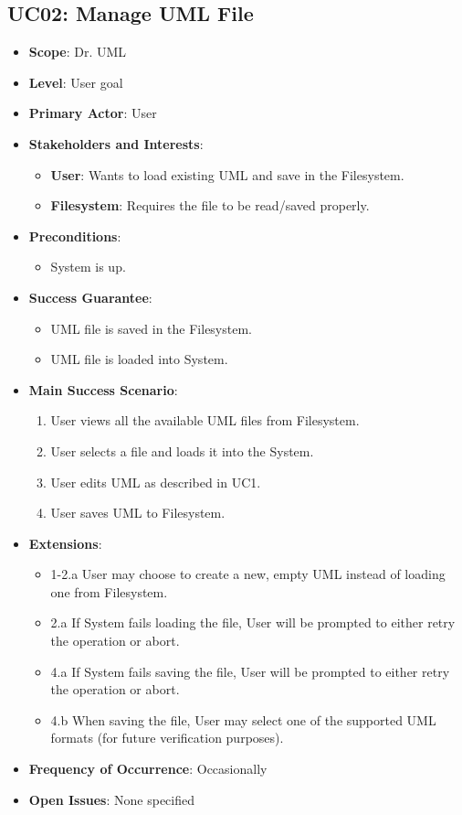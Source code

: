 \documentclass[12pt]{article}
\begin{document}
\subsection{UC02: Manage UML File}
\begin{itemize}
    \item \textbf{Scope}: Dr. UML
    \item \textbf{Level}: User goal
    \item \textbf{Primary Actor}: User
    \item \textbf{Stakeholders and Interests}:
    \begin{itemize}
        \item \textbf{User}: Wants to load existing UML and save in the Filesystem.
        \item \textbf{Filesystem}: Requires the file to be read/saved properly.
    \end{itemize}
    \item \textbf{Preconditions}:
    \begin{itemize}
        \item System is up.
    \end{itemize}
    \item \textbf{Success Guarantee}: 
    \begin{itemize}
        \item UML file is saved in the Filesystem.
        \item UML file is loaded into System.
    \end{itemize}
    \item \textbf{Main Success Scenario}:
    \begin{enumerate}
        \item User views all the available UML files from Filesystem.
        \item User selects a file and loads it into the System.
        \item User edits UML as described in UC1.
        \item User saves UML to Filesystem.
    \end{enumerate}
    \item \textbf{Extensions}:
    \begin{itemize}
        \item 1-2.a User may choose to create a new, empty UML instead of loading one from Filesystem.
        \item 2.a If System fails loading the file, User will be prompted to either retry the operation or abort.
        \item 4.a If System fails saving the file, User will be prompted to either retry the operation or abort.
        \item 4.b When saving the file, User may select one of the supported UML formats (for future verification purposes).
    \end{itemize}
    \item \textbf{Frequency of Occurrence}: Occasionally
    \item \textbf{Open Issues}: None specified
\end{itemize}
\end{document}

